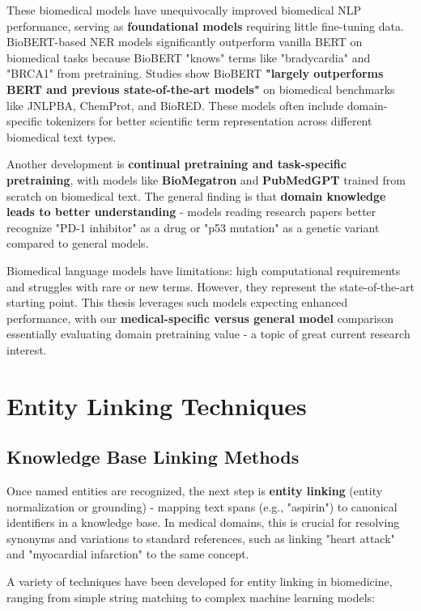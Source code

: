 These biomedical models have unequivocally improved biomedical NLP performance, serving as \textbf{foundational models} requiring little fine-tuning data. BioBERT-based NER models significantly outperform vanilla BERT on biomedical tasks because BioBERT "knows" terms like "bradycardia" and "BRCA1" from pretraining. Studies show BioBERT \textbf{"largely outperforms BERT and previous state-of-the-art models"} on biomedical benchmarks like JNLPBA, ChemProt, and BioRED. These models often include domain-specific tokenizers for better scientific term representation across different biomedical text types.

Another development is \textbf{continual pretraining and task-specific pretraining}, with models like \textbf{BioMegatron} and \textbf{PubMedGPT} trained from scratch on biomedical text. The general finding is that \textbf{domain knowledge leads to better understanding} - models reading research papers better recognize "PD-1 inhibitor" as a drug or "p53 mutation" as a genetic variant compared to general models.

Biomedical language models have limitations: high computational requirements and struggles with rare or new terms. However, they represent the state-of-the-art starting point. This thesis leverages such models expecting enhanced performance, with our \textbf{medical-specific versus general model} comparison essentially evaluating domain pretraining value - a topic of great current research interest.

\section{Entity Linking Techniques}

\subsection{Knowledge Base Linking Methods}

Once named entities are recognized, the next step is \textbf{entity linking} (entity normalization or grounding) - mapping text spans (e.g., "aspirin") to canonical identifiers in a knowledge base. In medical domains, this is crucial for resolving synonyms and variations to standard references, such as linking "heart attack" and "myocardial infarction" to the same concept.

A variety of techniques have been developed for entity linking in biomedicine, ranging from simple string matching to complex machine learning models:

